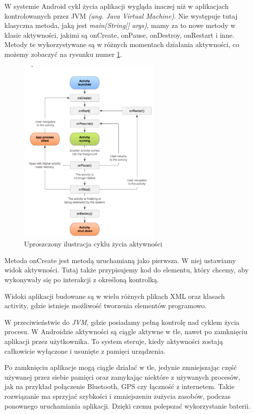 \documentclass[a4paper,12pt, twoside]{article}
\begin{document}
    	W systemie Android cykl życia aplikacji wygląda inaczej niż w aplikacjach kontrolowanych przez JVM \textit{(ang. Java Virtual Machine)}\cite{jvm}. Nie występuje tutaj klasyczna metoda, jaką jest \textit{main(String[] args)}, mamy za to nowe metody w klasie aktywności, jakimi są onCreate, onPause, onDestroy, onRestart i inne. Metody te wykorzystywane są w różnych momentach działania aktywności, co możemy zobaczyć na rysunku numer \ref{fig:lifecycle}.
    
    	\begin{figure}[H]
    	        \centering
    			\includegraphics[width=7cm]{images/rys6_androidlifecycle.png}
    			\caption{Uproszczony ilustracja cyklu życia aktywności\cite{lifecycle}}
                \label{fig:lifecycle}
    	\end{figure}
    	
    	Metoda onCreate jest metodą uruchamianą jako pierwsza. W niej ustawiamy widok aktywności. Tutaj także przypisujemy kod do elementu, który chcemy, aby wykonywały się po interakcji z określoną kontrolką.
    	
    	Widoki aplikacji budowane są w wielu różnych plikach XML oraz klasach activity, gdzie istnieje możliwość tworzenia elementów programowo.
    	
    	W przeciwieństwie do \textit{JVM}, gdzie posiadamy pełną kontrolę nad cyklem życia procesu. W Androidzie aktywności są ciągle aktywne w tle, nawet po zamknięciu aplikacji przez użytkownika. To system steruje, kiedy aktywności zostają całkowicie wyłączone i usunięte z pamięci urządzenia. 
    	
    	Po zamknięciu aplikacje mogą ciągle działać w tle, jedynie zmniejszając część używanej przez siebie pamięci oraz zamykając niektóre z używanych procesów, jak na przykład połączenie Bluetooth, GPS czy łączność z internetem. Takie rozwiązanie ma sprzyjać szybkości i zmniejszeniu zużycia zasobów, podczas ponownego uruchamiania aplikacji. Dzięki czemu polepszać wykorzystanie baterii\cite{batterysave}.
    	
\end{document}
